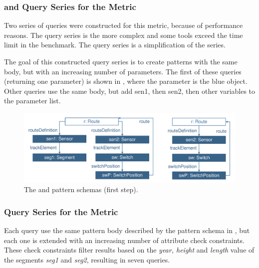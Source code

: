 \subsubsection{ and  Query Series for the
 Metric} Two series of queries were constructed for this
metric, because of performance reasons. The  query series is the more
complex and some tools exceed the time limit in the benchmark. The
 query series is a simplification of the 
series.

The goal of this constructed query series is to create patterns with the same
body, but with an increasing number of parameters. The first of these queries
(returning one parameter) is shown in , where the
parameter is the blue object. Other queries use the same body, but add sen1,
then sen2, then other variables to the parameter list.

\begin{figure}[Htb]
\begin{center}
    \includegraphics[scale=0.4]{figures/parameters.pdf}
    \caption{The  and  pattern schemas (first step).}
    \label{fig:aseparams}
\end{center}
\end{figure}



\subsubsection{ Query Series for the  Metric}
Each  query use the same pattern body described by the pattern
schema in , but each one is extended with an increasing
number of attribute check constraints. These check constraints filter results
based on the \emph{year, height} and \emph{length} value of the segments \emph{seg1} and
\emph{seg2}, resulting in seven queries.

